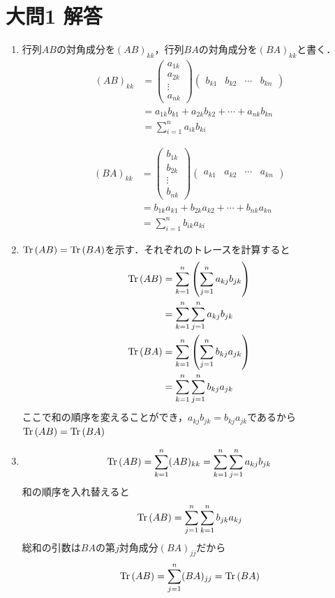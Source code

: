 \documentclass[dvipdfmx]{jsreport}
\begin{document}
\section{大問1 解答}
\begin{souanswer} %
\begin{enumerate}
	\item 行列$AB$の対角成分を$(AB)_{kk}$，行列$BA$の対角成分を$(BA)_{kk}$と書く．
\begin{align*}
	(AB)_{kk}
&= \begin{pmatrix}a_{1k}\\ a_{2k}\\ \vdots\\ a_{nk}\end{pmatrix}\begin{pmatrix}b_{k1}& b_{k2}& \cdots& b_{kn}\end{pmatrix}\\
&= a_{1k}b_{k1}+ a_{2k}b_{k2}+ \cdots+ a_{nk}b_{kn}\\
&= \sum_{i= 1}^n a_{ik}b_{ki}
\end{align*}

\begin{align*}
	(BA)_{kk}
&= \begin{pmatrix}b_{1k}\\ b_{2k}\\ \vdots\\ b_{nk}\end{pmatrix}\begin{pmatrix}a_{k1}& a_{k2}& \cdots& a_{kn}\end{pmatrix}\\
&= b_{1k}a_{k1}+ b_{2k}a_{k2}+ \cdots+ b_{nk}a_{kn}\\
&= \sum_{i= 1}^n b_{ik}a_{ki}
\end{align*}

	\item $\operatorname{Tr}{(AB)}= \operatorname{Tr}{(BA)}$を示す．それぞれのトレースを計算すると
\begin{align*}
	\operatorname{Tr}{(AB)}
&= \sum_{k= 1}^n \left(\sum_{j= 1}^ n a_{kj}b_{jk}\right)\\
&= \sum_{k= 1}^n \sum_{j= 1}^ n a_{kj}b_{jk}\\
	\operatorname{Tr}{(BA)}
&= \sum_{k= 1}^n \left(\sum_{j= 1}^ n b_{kj}a_{jk}\right)\\
&= \sum_{k= 1}^n \sum_{j= 1}^n b_{kj}a_{jk}
\end{align*}
	ここで和の順序を変えることができ，$a_{kj}b_{jk}= b_{kj}a_{jk}$であるから$\operatorname{Tr}{(AB)}= \operatorname{Tr}{(BA)}$

	\item 
\begin{equation*}
	\operatorname{Tr}{(AB)}= \sum_{k= 1}^n(AB)_{kk}= \sum_{k= 1}^n \sum_{j= 1}^n a_{kj}b_{jk}
\end{equation*}
	和の順序を入れ替えると
\begin{equation*}
	\operatorname{Tr}{(AB)}= \sum_{j= 1}^n\sum_{k= 1}^n b_{jk}a_{kj}
\end{equation*}
	総和の引数は$BA$の第$j$対角成分$(BA)_{jj}$だから
\begin{equation*}
	\operatorname{Tr}{(AB)}= \sum_{j= 1}^n(BA)_{jj}= \operatorname{Tr}{(BA)}
\end{equation*}


\end{enumerate}
\end{souanswer}
\end{document}
